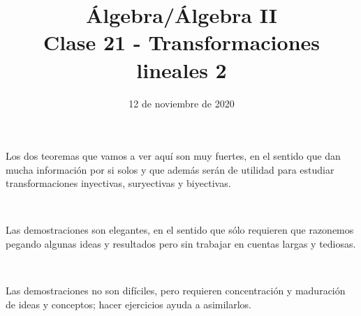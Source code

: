 \documentclass[handout]{beamer} %
\title[Clase 21 - Transformaciones lineales 2]{Álgebra/Álgebra II \\ Clase 21 - Transformaciones lineales 2}
\author[]{}
\institute[]{\normalsize FAMAF / UNC
	\\[\baselineskip] ${}^{}$
	\\[\baselineskip]
}
\date[12/11/2020]{12 de noviembre de 2020}
\newcommand{\im}{\operatorname{Im}}
\renewcommand\nu{\operatorname{Nu}}
\begin{document}
\begin{frame}
\maketitle
\end{frame}




\begin{frame}
Los dos teoremas que vamos a ver aquí son muy fuertes, en el sentido que dan mucha información por si solos y que además serán de utilidad para estudiar transformaciones inyectivas, suryectivas y biyectivas.
\pause

\

Las demostraciones son elegantes, en el sentido que sólo requieren que razonemos pegando algunas ideas y resultados pero sin trabajar en cuentas largas y tediosas.
\pause

\

Las demostraciones no son difíciles, pero requieren concentración y maduración de ideas y conceptos; hacer ejercicios ayuda a asimilarlos.
\pause
\


\end{frame}


\end{document}
